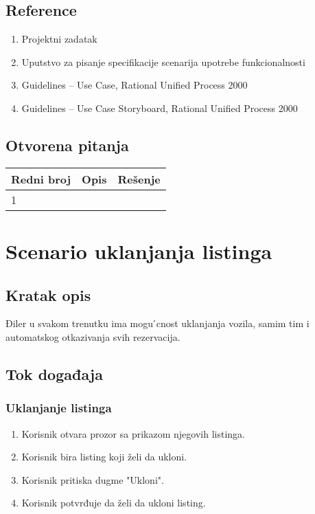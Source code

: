 \documentclass[12pt]{article}
\begin{document}
\subsection{Reference}
\begin{enumerate}
   \item Projektni zadatak
   \item Uputstvo za pisanje specifikacije scenarija upotrebe funkcionalnosti
   \item  Guidelines – Use Case, Rational Unified Process 2000
   \item  Guidelines – Use Case Storyboard, Rational Unified Process 2000
 \end{enumerate}
\subsection{Otvorena pitanja}


\begin{center}
\begin{tabular}{ | m{2cm} | m{7cm}| m{7cm} | } 
\hline
Redni broj& Opis & Rešenje \\ 
\hline
1 &  & \\ 
\hline
\end{tabular}
\end{center}

    

\section{Scenario uklanjanja listinga}
\subsection{Kratak opis}
Điler u svakom trenutku ima mogu ́cnost uklanjanja vozila, samim tim i automatskog otkazivanja svih rezervacija.
\subsection{Tok događaja}

\subsubsection{Uklanjanje listinga}
\begin{enumerate}
  \item Korisnik otvara prozor sa prikazom njegovih listinga.
  \item Korisnik bira listing koji želi da ukloni.
  \item Korisnik pritiska dugme "Ukloni".
  \item Korisnik potvrđuje da želi da ukloni listing.
\end{enumerate}
\end{document}
